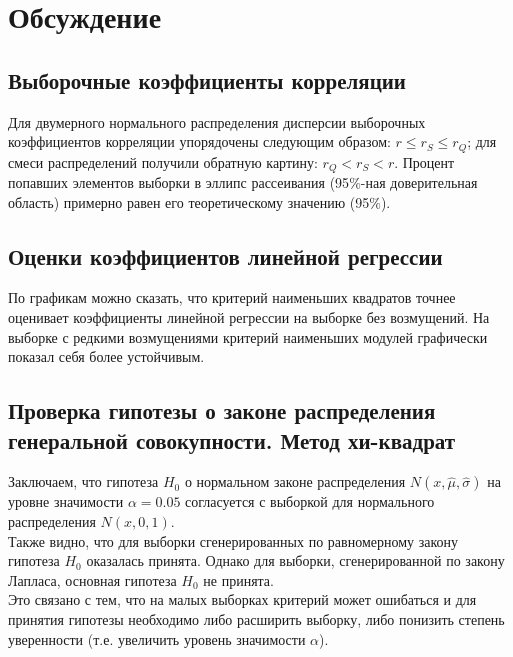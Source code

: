 \documentclass[main.tex]{subfiles}
\begin{document}
\section{Обсуждение}
\subsection{Выборочные коэффициенты корреляции}
\noindent Для двумерного нормального распределения дисперсии выборочных коэффициентов корреляции упорядочены следующим образом: $r \leq r_{S} \leq r_{Q}$; для смеси распределений получили обратную картину: $r_{Q} < r_{S} < r$.
\newline
\noindent Процент попавших элементов выборки в эллипс рассеивания (95$\%$-ная доверительная область) примерно равен его теоретическому значению (95$\%$).
\subsection{Оценки коэффициентов линейной регрессии}
\noindent По графикам можно сказать, что критерий наименьших квадратов точнее оценивает коэффициенты
линейной регрессии на выборке без возмущений. На выборке с редкими возмущениями 
критерий наименьших модулей графически показал себя более устойчивым. \\

\subsection{Проверка гипотезы о законе распределения генеральной совокупности. Метод хи-квадрат}

\noindent Заключаем, что гипотеза $H_{0}$ о нормальном законе распределения $N(x,\hat{\mu}, \hat{\sigma})$ на уровне значимости $\alpha = 0.05$ согласуется с выборкой для нормального распределения $N(x, 0, 1)$.
\\
Также видно, что для выборки сгенерированных по равномерному закону гипотеза $H_{0}$ оказалась принята. Однако для выборки, сгенерированной по закону Лапласа, основная гипотеза  $H_{0}$ не принята. \\ 
Это связано с тем, что на малых выборках критерий может ошибаться и для принятия гипотезы необходимо либо расширить выборку, либо понизить степень уверенности (т.е. увеличить уровень значимости $\alpha$).
\end{document}

